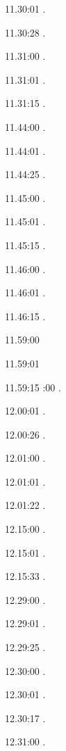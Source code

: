 \label{key}\documentclass[italian]{article}
\begin{document}
11.30:01   .

11.30:28   .

11.31:00   .

11.31:01   .

11.31:15   .

11.44:00   .

11.44:01   .

11.44:25   .

11.45:00   .

11.45:01   .

11.45:15   .

11.46:00   .

11.46:01   .

11.46:15   .

11.59:00   

11.59:01   

11.59:15   
:00   .

12.00:01  .

12.00:26   .

12.01:00    . 

12.01:01    . 

12.01:22    . 

12.15:00   . 

12.15:01    . 

12.15:33    . 

12.29:00    . 

12.29:01    .

12.29:25    .

12.30:00    .

12.30:01    .

12.30:17    .

12.31:00    .
\end{document}
